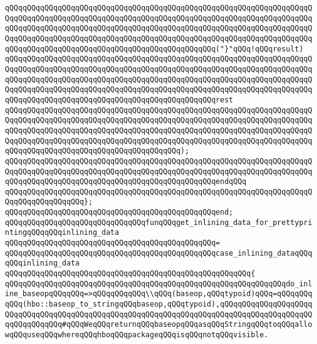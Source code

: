 \verb|qQQqqQQqqQQqqQQqqQQqqQQqqQQqqQQqqQQqqQQqqQQqqQQqqQQqqQQqqQQqqQQqqQQqqQQqqQQqqQQqqQQqqQQqqQQqqQQqqQQqqQQqqQQqqQQqqQQqqQQqqQQqqQQqqQQqqQQqqQQqqQQqqQQqqQQqqQQqqQQqqQQqqQQqqQQqqQQqqQQqqQQqqQQqqQQqqQQqqQQqqQQqqQQqqQQqqQQqqQQqqQQqqQQqqQQqqQQqqQQqqQQqqQQqqQQqqQQqqQQqqQQqqQQqqQQqqQQqqQQqqQQqqQQqqQQqqQQqqQQqqQQqqQQqqQQqqQQqqQQqqQQqqQQq("}"qQQq!qQQqresult)|\newline
\verb|qQQqqQQqqQQqqQQqqQQqqQQqqQQqqQQqqQQqqQQqqQQqqQQqqQQqqQQqqQQqqQQqqQQqqQQqqQQqqQQqqQQqqQQqqQQqqQQqqQQqqQQqqQQqqQQqqQQqqQQqqQQqqQQqqQQqqQQqqQQqqQQqqQQqqQQqqQQqqQQqqQQqqQQqqQQqqQQqqQQqqQQqqQQqqQQqqQQqqQQqqQQqqQQqqQQqqQQqqQQqqQQqqQQqqQQqqQQqqQQqqQQqqQQqqQQqqQQqqQQqqQQqqQQqqQQqqQQqqQQqqQQqqQQqqQQqqQQqqQQqqQQqqQQqqQQqqQQqqQQqqQQqqQQqrest|\newline
\verb|qQQqqQQqqQQqqQQqqQQqqQQqqQQqqQQqqQQqqQQqqQQqqQQqqQQqqQQqqQQqqQQqqQQqqQQqqQQqqQQqqQQqqQQqqQQqqQQqqQQqqQQqqQQqqQQqqQQqqQQqqQQqqQQqqQQqqQQqqQQqqQQqqQQqqQQqqQQqqQQqqQQqqQQqqQQqqQQqqQQqqQQqqQQqqQQqqQQqqQQqqQQqqQQqqQQqqQQqqQQqqQQqqQQqqQQqqQQqqQQqqQQqqQQqqQQqqQQqqQQqqQQqqQQqqQQqqQQqqQQqqQQqqQQqqQQqqQQqqQQqqQQqqQQqqQQqqQQqqQQq);|\newline
\verb|qQQqqQQqqQQqqQQqqQQqqQQqqQQqqQQqqQQqqQQqqQQqqQQqqQQqqQQqqQQqqQQqqQQqqQQqqQQqqQQqqQQqqQQqqQQqqQQqqQQqqQQqqQQqqQQqqQQqqQQqqQQqqQQqqQQqqQQqqQQqqQQqqQQqqQQqqQQqqQQqqQQqqQQqqQQqqQQqqQQqqQQqqQQqendqQQq|\newline
\verb|qQQqqQQqqQQqqQQqqQQqqQQqqQQqqQQqqQQqqQQqqQQqqQQqqQQqqQQqqQQqqQQqqQQqqQQqqQQqqQQqqQQqqQQq};|\newline
\newline
\verb|qQQqqQQqqQQqqQQqqQQqqQQqqQQqqQQqqQQqqQQqqQQqqQQqend;|\newline
\newline
\verb|qQQqqQQqqQQqqQQqqQQqqQQqqQQqqQQqfunqQQqget_inlining_data_for_prettyprintingqQQqqQQqinlining_data|\newline
\verb|qQQqqQQqqQQqqQQqqQQqqQQqqQQqqQQqqQQqqQQqqQQqqQQq=|\newline
\verb|qQQqqQQqqQQqqQQqqQQqqQQqqQQqqQQqqQQqqQQqqQQqqQQqcase_inlining_dataqQQqqQQqinlining_data|\newline
\verb|qQQqqQQqqQQqqQQqqQQqqQQqqQQqqQQqqQQqqQQqqQQqqQQqqQQqqQQq{|\newline
\verb|qQQqqQQqqQQqqQQqqQQqqQQqqQQqqQQqqQQqqQQqqQQqqQQqqQQqqQQqqQQqqQQqdo_inline_baseopqQQqqQQq=>qQQqqQQqqQQq\\qQQq(baseop,qQQqtypoid)qQQq=qQQqqQQqqQQq(hbo::baseop_to_stringqQQqbaseop,qQQqtypoid),qQQqqQQqqQQqqQQqqQQqqQQqqQQqqQQqqQQqqQQqqQQqqQQqqQQqqQQqqQQqqQQqqQQqqQQqqQQqqQQqqQQqqQQqqQQqqQQqqQQqqQQq#qQQqWeqQQqreturnqQQqbaseopqQQqasqQQqStringqQQqtoqQQqallowqQQquseqQQqwhereqQQqhboqQQqpackageqQQqisqQQqnotqQQqvisible.|\newline
